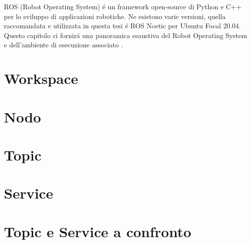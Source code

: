 ROS (Robot Operating System) \'{e} un framework open-source di Python e C++ per lo sviluppo di applicazioni robotiche.
Ne esistono varie versioni, quella raccomandata e utilizzata in questa tesi \'{e} ROS Noetic per Ubuntu Focal 20.04.
Questo capitolo ci fornir\'{a} una panoramica esaustiva del Robot Operating System e dell'ambiente di esecuzione associato 
\cite{ros}.

\section{Workspace}


\section{Nodo}


\section{Topic}


\section{Service}


\section{Topic e Service a confronto}
